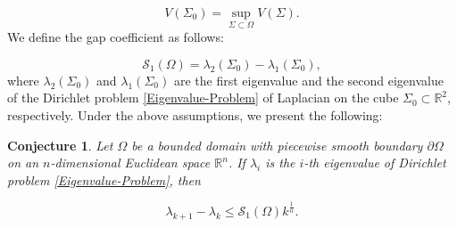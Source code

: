 \documentclass[12pt]{article}
\newtheorem{con}[thm]{Conjecture}
\numberwithin{equation}{section}
\begin{document}
$$V(\Sigma_{0})=\sup_{\Sigma\subset\Omega}V(\Sigma).$$ We define the gap coefficient as follows:

\begin{equation*}\mathcal{S}_{1}(\Omega)=
 \lambda_{2}(\Sigma_{0})-\lambda_{1}(\Sigma_{0}),
                          \end{equation*}where $\lambda_{2}(\Sigma_{0})$ and $\lambda_{1}(\Sigma_{0})$ are the first eigenvalue and the
second eigenvalue of the Dirichlet problem \eqref{Eigenvalue-Problem} of Laplacian on the cube $\Sigma_{0}\subset\mathbb{R}^{2}$, respectively.
 Under the above assumptions, we present the following:


\begin{con}\label{conj-z1}
Let $\Omega$ be a bounded domain with piecewise smooth boundary $\partial\Omega$ on an $n$-dimensional Euclidean space
$\mathbb{R}^{n}$. If $\lambda_{i}$ is the $i$-th eigenvalue of Dirichlet problem \eqref{Eigenvalue-Problem}, then


\begin{equation}\label{con-z1}\lambda_{k+1}-\lambda_{k}\leq\mathcal{S}_{1}(\Omega)k^{\frac{1}{n}}.
\end{equation}

\end{con}
\end{document}

